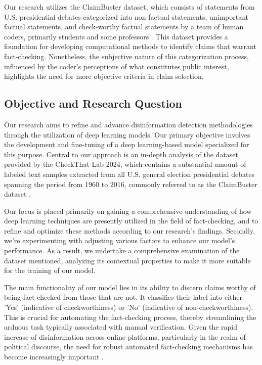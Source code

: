 Our research utilizes the ClaimBuster dataset, which consists of statements from U.S. presidential debates categorized into non-factual statements, unimportant factual statements, and check-worthy factual statements by a team of human coders, primarily students and some professors \cite{claimbuster_arslan}. This dataset provides a foundation for developing computational methods to identify claims that warrant fact-checking. Nonetheless, the subjective nature of this categorization process, influenced by the coder's perceptions of what constitutes public interest, highlights the need for more objective criteria in claim selection.

\subsection{Objective and Research Question}
Our research aims to refine and advance disinformation detection methodologies through the utilization of deep learning models. Our primary objective involves the development and fine-tuning of a deep learning-based model specialized for this purpose. Central to our approach is an in-depth analysis of the dataset provided by the CheckThat Lab 2024, which contains a substantial amount of labeled text samples extracted  from  all  U.S.  general election presidential debates spanning the period from 1960 to 2016, commonly referred to as the ClaimBuster dataset \cite{claimbuster_arslan}. 

Our focus is placed primarily on gaining a comprehensive understanding of how deep learning techniques are presently utilized in the field of fact-checking, and to refine and optimize these methods according to our research’s findings. Secondly, we're experimenting with adjusting various factors to enhance our model's performance. As a result, we undertake a comprehensive examination of the dataset mentioned, analyzing its contextual properties to make it more suitable for the training of our model.

The main functionality of our model lies in its ability to discern claims worthy of being fact-checked from those that are not. It classifies their label into either 'Yes' (indicative of checkworthiness) or 'No' (indicative of non-checkworthiness). This is crucial for automating the fact-checking process, thereby streamlining the arduous task typically associated with manual verification. Given the rapid increase of disinformation across online platforms, particularly in the realm of political discourse, the need for robust automated fact-checking mechanisms has become increasingly important \cite{guo_automated_factcheckingsurvey}.

